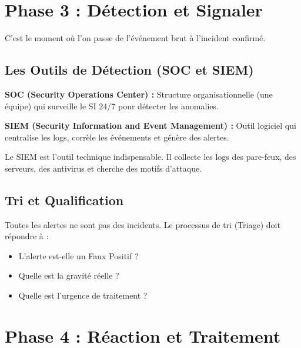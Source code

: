 \section{Phase 3 : Détection et Signaler}

C'est le moment où l'on passe de l'événement brut à l'incident confirmé.

\subsection{Les Outils de Détection (SOC et SIEM)}

\begin{boxdef}
\textbf{SOC (Security Operations Center) :} Structure organisationnelle (une équipe) qui surveille le SI 24/7 pour détecter les anomalies.
\end{boxdef}

\begin{boxdef}
\textbf{SIEM (Security Information and Event Management) :} Outil logiciel qui centralise les logs, corrèle les événements et génère des alertes.
\end{boxdef}

Le SIEM est l'outil technique indispensable. Il collecte les logs des pare-feux, des serveurs, des antivirus et cherche des motifs d'attaque.

\subsection{Tri et Qualification}

Toutes les alertes ne sont pas des incidents. Le processus de tri (Triage) doit répondre à :
\begin{itemize}
    \item L'alerte est-elle un Faux Positif ?
    \item Quelle est la gravité réelle ?
    \item Quelle est l'urgence de traitement ?
\end{itemize}

\section{Phase 4 : Réaction et Traitement}

